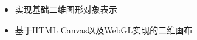 \documentclass{resume}
\begin{document}
\begin{onehalfspacing}
\begin{itemize}
  \item 实现基础二维图形对象表示
  \item 基于HTML Canvas以及WebGL实现的二维画布
\end{itemize}
\end{onehalfspacing}




\end{document}
